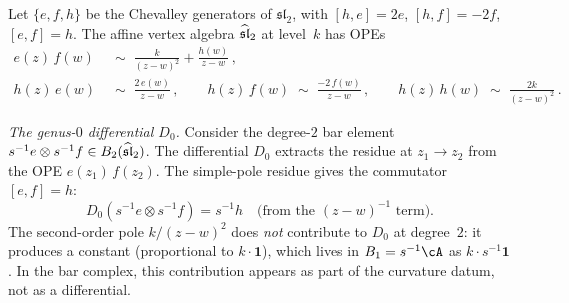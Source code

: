 \begin{example}
\label{ex:sl2-bar}
Let $\{e, f, h\}$ be the Chevalley generators of
$\mathfrak{sl}_2$, with $[h,e] = 2e$, $[h,f] = -2f$,
$[e,f] = h$. The affine vertex algebra $\widehat{\mathfrak{sl}}_2$ at
level~$k$ has OPEs
\begin{equation}\label{eq:sl2-opes}
\begin{aligned}
 e(z)\, f(w) &\;\sim\; \frac{k}{(z-w)^2} + \frac{h(w)}{z-w}\,, \\
 h(z)\, e(w) &\;\sim\; \frac{2\, e(w)}{z-w}\,,
 \qquad
 h(z)\, f(w) \;\sim\; \frac{-2\, f(w)}{z-w}\,,
 \qquad
 h(z)\, h(w) \;\sim\; \frac{2k}{(z-w)^2}\,.
\end{aligned}
\end{equation}

\medskip\noindent
\emph{The genus-$0$ differential $D_0$.}
Consider the degree-$2$ bar element
$s^{-1}e \otimes s^{-1}f \in B_2(\widehat{\mathfrak{sl}}_2)$.
The differential $D_0$ extracts the residue at $z_1 \to z_2$
from the OPE $e(z_1)\, f(z_2)$.
The simple-pole residue gives the commutator $[e, f] = h$:
\[
 D_0(s^{-1}e \otimes s^{-1}f)
 = s^{-1} h
 \quad \text{(from the $(z-w)^{-1}$ term)}.
\]
The second-order pole $k/(z-w)^2$ does \emph{not} contribute
to $D_0$ at degree~$2$: it produces a constant (proportional
to $k \cdot \mathbf{1}$), which lives in $B_1 = s^{-1}\cA$ as
$k \cdot s^{-1}\mathbf{1}$. In the bar complex, this
contribution appears as part of the curvature datum, not as
a differential.


\end{example}
